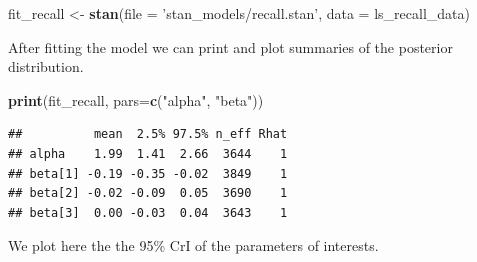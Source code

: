 \documentclass[12pt,]{krantz}
\newenvironment{Shaded}{\begin{snugshade}}{\end{snugshade}}
\newcommand{\KeywordTok}[1]{\textcolor[rgb]{0.13,0.29,0.53}{\textbf{#1}}}
\newcommand{\DataTypeTok}[1]{\textcolor[rgb]{0.13,0.29,0.53}{#1}}
\newcommand{\DecValTok}[1]{\textcolor[rgb]{0.00,0.00,0.81}{#1}}
\newcommand{\StringTok}[1]{\textcolor[rgb]{0.31,0.60,0.02}{#1}}
\newcommand{\OperatorTok}[1]{\textcolor[rgb]{0.81,0.36,0.00}{\textbf{#1}}}
\newcommand{\NormalTok}[1]{#1}
\theoremstyle{definition}
\theoremstyle{definition}
\theoremstyle{definition}
\theoremstyle{remark}
\begin{document}
\begin{Shaded}
\end{Shaded}

\begin{Shaded}
\begin{Highlighting}[]
\NormalTok{fit_recall <-}\StringTok{ }\KeywordTok{stan}\NormalTok{(}\DataTypeTok{file =} \StringTok{'stan_models/recall.stan'}\NormalTok{,}
                   \DataTypeTok{data =}\NormalTok{ ls_recall_data)}
\end{Highlighting}
\end{Shaded}

After fitting the model we can print and plot summaries of the posterior
distribution.

\begin{Shaded}
\begin{Highlighting}[]
\KeywordTok{print}\NormalTok{(fit_recall, }\DataTypeTok{pars=}\KeywordTok{c}\NormalTok{(}\StringTok{"alpha"}\NormalTok{, }\StringTok{"beta"}\NormalTok{))}
\end{Highlighting}
\end{Shaded}

\begin{verbatim}
##          mean  2.5% 97.5% n_eff Rhat
## alpha    1.99  1.41  2.66  3644    1
## beta[1] -0.19 -0.35 -0.02  3849    1
## beta[2] -0.02 -0.09  0.05  3690    1
## beta[3]  0.00 -0.03  0.04  3643    1
\end{verbatim}

We plot here the the 95\% CrI of the parameters of interests.
\end{document}
